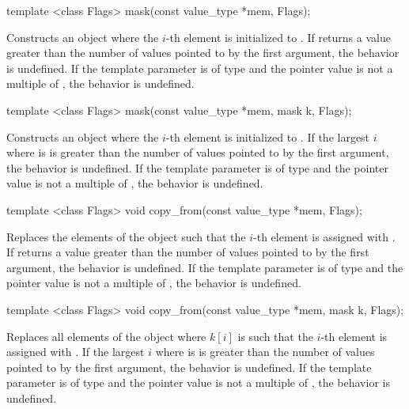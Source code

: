 \begin{itemdecl}
template <class Flags> mask(const value_type *mem, Flags);
\end{itemdecl}
\begin{itemdescr}
  \pnum\effects Constructs an object where the $i$-th element is initialized to  \foralli.
  \pnum\remarks If  returns a value greater than the number of values pointed to by the first argument, the behavior is undefined.
  \pnum\remarks If the  template parameter is of type  and the pointer value is not a multiple of , the behavior is undefined.
\end{itemdescr}

\begin{itemdecl}
template <class Flags> mask(const value_type *mem, mask k, Flags);
\end{itemdecl}
\begin{itemdescr}
  \pnum\effects Constructs an object where the $i$-th element is initialized to  \foralli.
  \pnum\remarks If the largest $i$ where  is \true is greater than the number of values pointed to by the first argument, the behavior is undefined.
  \pnum\remarks If the  template parameter is of type  and the pointer value is not a multiple of , the behavior is undefined.
\end{itemdescr}

\begin{itemdecl}
template <class Flags> void copy_from(const value_type *mem, Flags);
\end{itemdecl}
\begin{itemdescr}
  \pnum\effects Replaces the elements of the \mask object such that the $i$-th element is assigned with  \foralli.
  \pnum\remarks If  returns a value greater than the number of values pointed to by the first argument, the behavior is undefined.
  \pnum\remarks If the  template parameter is of type  and the pointer value is not a multiple of , the behavior is undefined.
\end{itemdescr}

\begin{itemdecl}
template <class Flags> void copy_from(const value_type *mem, mask k, Flags);
\end{itemdecl}
\begin{itemdescr}
  \pnum\effects Replaces all elements of the \mask object where $k[i]$ is \true such that the $i$-th element is assigned with  \foralli.
  \pnum\remarks If the largest $i$ where  is \true is greater than the number of values pointed to by the first argument, the behavior is undefined.
  \pnum\remarks If the  template parameter is of type  and the pointer value is not a multiple of , the behavior is undefined.
\end{itemdescr}

